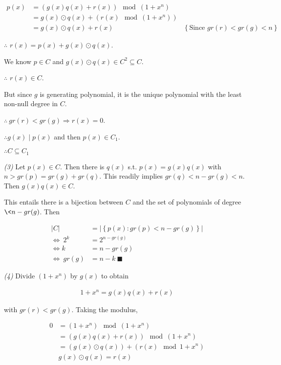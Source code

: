 \begin{align*}
    p(x) &= \left( g(x) q(x) + r(x) \right)  \mod (1 + x^n)\\ 
         &= g(x) \odot q(x) + \left( r(x) \mod (1 + x^n) \right)  \\ 
         &= g(x) \odot q(x) + r(x) &\left\{ \text{Since $gr(r) < gr(g) < n$} \right\} 
\end{align*}

$\therefore $ $r(x) = p(x) + g(x) \odot q(x)$. 

We know $p \in C$ and $g(x) \odot q(x) \in C^2 \subseteq C$. 

$\therefore $ $r(x) \in C$.

But since $g$ is generating polynomial, it is the unique polynomial with the
least non-null degree in $C$.

$\therefore ~ gr(r) < gr(g) \Rightarrow r(x) = 0$.

$\therefore g(x) \mid p(x)$ and then $p(x) \in C_1$.

$\therefore C \subseteq C_1$

\textit{(3)} Let $p(x) \in C$. Then there is $q(x)$ s.t. $p(x) = g(x) q(x)$
with $n > gr(p) = gr(g) + gr(q)$. This readily implies $gr(q) < n - gr(g) < n$.
Then $g(x) q(x) \in C$.

This entails there is a bijection between $C$ and the set of polynomials of
degree $\< n - gr(g)$. Then 

\begin{align*}
    |C| &= |\left\{ p(x) : gr(p) < n - gr(g) \right\} | \\ 
    \iff ~ 2^k &= 2^{n-gr(g)} \\ 
    \iff k &= n - gr(g) \\ 
    \iff ~ gr(g) &= n - k ~ \blacksquare
\end{align*}

\textit{(4)} Divide $(1 + x^n)$ by $g(x)$ to obtain 

\begin{align*}
    1 + x^n = g(x) q(x) + r(x)
\end{align*}

with $gr(r) < gr(g)$. Taking the modulus, 

\begin{align*}
    0 &= (1 + x^n) \mod (1 + x^n) \\ 
      &=\left( g(x) q(x) + r(x) \right) \mod (1 + x^n) \\ 
      &= \left( g(x) \odot q(x) \right)  + \left( r(x) \mod 1 + x^n \right)  \\ 
      & g(x) \odot q(x) = r(x)
\end{align*}

